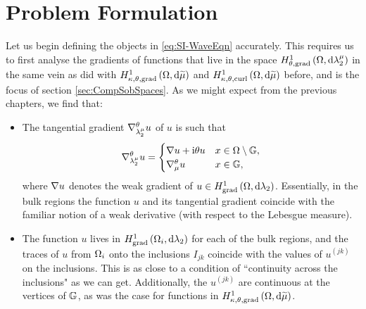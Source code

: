 \section{Problem Formulation} \label{sec:SI-ProblemFormulation}
Let us begin defining the objects in \eqref{eq:SI-WaveEqn} accurately.
This requires us to first analyse the gradients of functions that live in the space $H^1_{\theta, \mathrm{grad}}\left( \Omega, \mathrm{d}\lambda_2^{\mu} \right)$ in the same vein as did with $H^1_{\kappa,\theta,\mathrm{grad}}\left( \Omega, \mathrm{d}\widetilde{\mu} \right)$ and $H^1_{\kappa,\theta,\mathrm{curl}}\left( \Omega, \mathrm{d}\widetilde{\mu} \right)$ before, and is the focus of section \ref{sec:CompSobSpaces}.
As we might expect from the previous chapters, we find that:
\begin{itemize}
	\item The tangential gradient $\nabla^{\theta}_{\lambda_2^{\mu}}u$ of $u$ is such that
	\begin{align*}
		\nabla^{\theta}_{\lambda_2^{\mu}}u = \begin{cases} \nabla u + \mathrm{i}\theta u & x\in\Omega\setminus\mathbb{G}, \\ \nabla^{\theta}_{\mu}u & x\in\mathbb{G}, \end{cases}
	\end{align*}
	where $\nabla u$ denotes the weak gradient of $u\in H^1_\mathrm{grad}\left( \Omega, \mathrm{d}\lambda_2 \right)$.
	Essentially, in the bulk regions the function $u$ and its tangential gradient coincide with the familiar notion of a weak derivative (with respect to the Lebesgue measure).
	\item The function $u$ lives in $H^1_\mathrm{grad}\left( \Omega_i, \mathrm{d}\lambda_2 \right)$ for each of the bulk regions, and the traces of $u$ from $\Omega_i$ onto the inclusions $I_{jk}$ coincide with the values of $u^{(jk)}$ on the inclusions.
	This is as close to a condition of ``continuity across the inclusions" as we can get.
	Additionally, the $u^{(jk)}$ are continuous at the vertices of $\mathbb{G}$, as was the case for functions in $H^1_{\kappa,\theta,\mathrm{grad}}\left( \Omega, \mathrm{d}\widetilde{\mu} \right)$.
\end{itemize}

